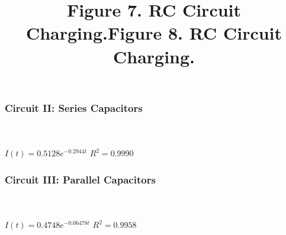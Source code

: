 \documentclass[12pt,letterpaper]{article}
\begin{document}
\subsubsection*{Circuit II: Series Capacitors}
\begin{center}
		\title{\textbf{Figure 7}. RC Circuit Charging.}\\
    	\resizebox{0.5\textwidth}{!}{}\\
    	\small$I(t)= 0.5128e^{-0.2944t}$ \hspace{24pt}$R^2 = 0.9990$
\end{center}
\vspace{-12pt}
\subsubsection*{Circuit III: Parallel Capacitors}
\begin{center}
		\title{\textbf{Figure 8}. RC Circuit Charging.}\\
    	\resizebox{0.5\textwidth}{!}{}\\
    	\small$I(t)= 0.4748e^{-0.06478t}$ \hspace{24pt}$R^2 = 0.9958$
\end{center}
\end{document}

